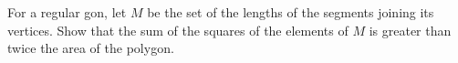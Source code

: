 For a regular gon, let $M$ be the set of the lengths of the segments joining its vertices. Show that the sum of the squares of the elements of $M$ is greater than twice the area of the polygon.